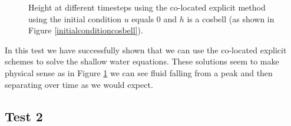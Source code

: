 \documentclass[a4paper,12pt, notitlepage]{article}
\begin{document}
\begin{figure} [H]
\begin{minipage}{.5\textwidth}
		\caption{\label{height_colocated_explicit_cosbell}    Height at different timesteps using the co-located explicit method using the initial condition $u$ equals $0$ and $h$ is a cosbell (as shown in Figure \ref{initialconditioncosbell}).} 
	\end{minipage}
\end{figure}
In this test we have successfully shown that we can use the co-located explicit schemes to solve the shallow water equations. These solutions seem to make physical sense as in Figure \ref{height_colocated_explicit_cosbell} we can see fluid falling from a peak and then separating over time as we would expect.

\subsection{Test 2}\label{sectiontest2}
\end{document}
